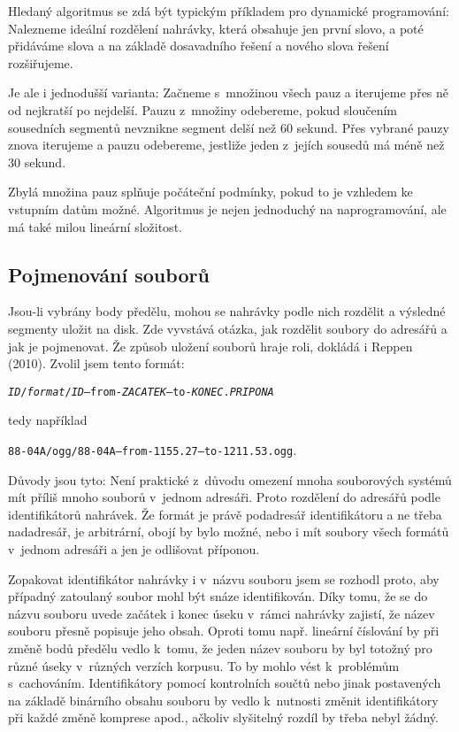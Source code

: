 Hledaný algoritmus se zdá být typickým příkladem pro dynamické programování:
Nalezneme ideální rozdělení nahrávky, která obsahuje jen první slovo, a poté
přidáváme slova a na základě dosavadního řešení a nového slova řešení
rozšiřujeme.

Je ale i jednodušší varianta: Začneme s~množinou všech pauz a iterujeme přes ně
od nejkratší po nejdelší. Pauzu z~množiny odebereme, pokud sloučením sousedních
segmentů nevznikne segment delší než 60 sekund. Přes vybrané pauzy znova
iterujeme a pauzu odebereme, jestliže jeden z~jejích sousedů má méně než 30
sekund.

Zbylá množina pauz splňuje počáteční podmínky, pokud to je vzhledem ke vstupním
datům možné. Algoritmus je nejen jednoduchý na naprogramování, ale má také milou
lineární složitost.

\subsection{Pojmenování souborů}

Jsou-li vybrány body předělu, mohou se nahrávky podle nich rozdělit a výsledné
segmenty uložit na disk. Zde vyvstává otázka, jak rozdělit soubory do adresářů a
jak je pojmenovat. Že způsob uložení souborů hraje roli, dokládá i Reppen (2010)\cite{reppen2010building}. Zvolil jsem tento formát:

\texttt{{\em{}ID}/{\em{}format}/{\em{}ID}--from-{\em{}ZACATEK}--to-{\em{}KONEC}.{\em{}PRIPONA}}

tedy například

\texttt{88-04A/ogg/88-04A--from-1155.27--to-1211.53.ogg}.

Důvody jsou tyto: Není praktické z~důvodu omezení mnoha souborových systémů mít
příliš mnoho souborů v~jednom adresáři. Proto rozdělení do adresářů podle
identifikátorů nahrávek. Že formát je právě podadresář identifikátoru a ne třeba
nadadresář, je arbitrární, obojí by bylo možné, nebo i mít soubory všech formátů
v~jednom adresáři a jen je odlišovat příponou.

Zopakovat identifikátor nahrávky i v~názvu souboru jsem se rozhodl proto, aby
případný zatoulaný soubor mohl být snáze identifikován. Díky tomu, že se do
názvu souboru uvede začátek i konec úseku v~rámci nahrávky zajistí, že název
souboru přesně popisuje jeho obsah. Oproti tomu např. lineární číslování by při
změně bodů předělu vedlo k~tomu, že jeden název souboru by byl totožný pro různé
úseky v~různých verzích korpusu. To by mohlo vést k~problémům s~cachováním.
Identifikátory pomocí kontrolních součtů nebo jinak postavených na základě
binárního obsahu souboru by vedlo k~nutnosti změnit identifikátory při každé
změně komprese apod., ačkoliv slyšitelný rozdíl by třeba nebyl žádný.

